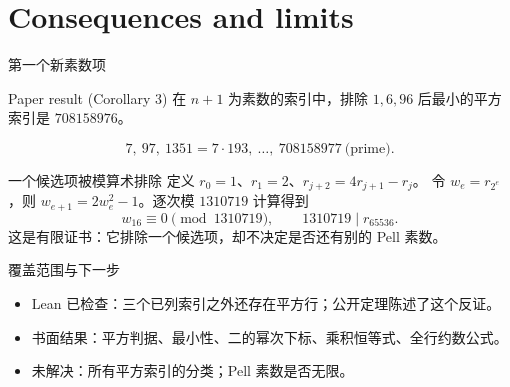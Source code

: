 \documentclass{beamer}
\begin{document}
\section[Scope]{Consequences and limits}
\begin{frame}{第一个新素数项}
  \begin{block}{Paper result (Corollary 3)}
    在 $n+1$ 为素数的索引中，排除 $1,6,96$ 后最小的平方索引是 $708158976$。
  \end{block}
  \[
  7,\ 97,\ 1351=7\cdot193,\ \ldots,\ 708158977\ \text{(prime)}.
  \]
\end{frame}
\begin{frame}{一个候选项被模算术排除}
  定义 $r_0=1$、$r_1=2$、$r_{j+2}=4r_{j+1}-r_j$。
  令 $w_e=r_{2^e}$，则 $w_{e+1}=2w_e^2-1$。逐次模 $1310719$ 计算得到
  \[
  w_{16}\equiv0\pmod{1310719},\qquad 1310719\mid r_{65536}.
  \]
  这是有限证书：它排除一个候选项，却不决定是否还有别的 Pell 素数。
\end{frame}
\begin{frame}{覆盖范围与下一步}
  \begin{itemize}
    \item Lean 已检查：三个已列索引之外还存在平方行；公开定理陈述了这个反证。
    \item 书面结果：平方判据、最小性、二的幂次下标、乘积恒等式、全行约数公式。
    \item 未解决：所有平方索引的分类；Pell 素数是否无限。
  \end{itemize}
\end{frame}
\appendix
\FormalVerification
\end{document}
